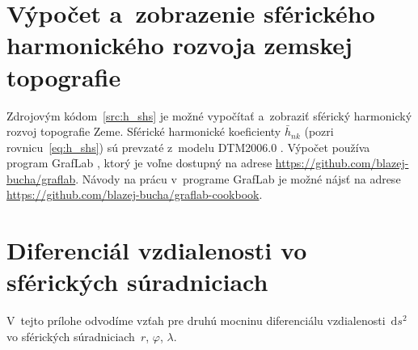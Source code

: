 \documentclass[a4paper,12pt]{book}
\newcommand{\diff}{\mathrm d}
\begin{document}
\chapter{Výpočet a~zobrazenie sférického harmonického rozvoja zemskej
topografie}
\label{app:shs_topography}

Zdrojovým kódom~\ref{src:h_shs} je možné vypočítať a~zobraziť sférický 
harmonický rozvoj topografie Zeme.  Sférické harmonické koeficienty 
$\bar{h}_{nk}$ (pozri rovnicu~\ref{eq:h_shs}) sú prevzaté z~modelu DTM2006.0 
\parencite{DTM2006}.  Výpočet používa program GrafLab \parencite{GrafLab}, 
ktorý je voľne dostupný na adrese 
\url{https://github.com/blazej-bucha/graflab}.  Návody na prácu v~programe 
GrafLab je možné nájsť na adrese 
\url{https://github.com/blazej-bucha/graflab-cookbook}.








\chapter{Diferenciál vzdialenosti vo sférických súradniciach}
\label{app:differential_of_line_element_in_sph_coords}

V~tejto prílohe odvodíme vzťah pre druhú mocninu diferenciálu 
vzdialenosti~$\diff s^2$ vo sférických súradniciach~$r$, $\varphi$, $\lambda$.
\end{document}
